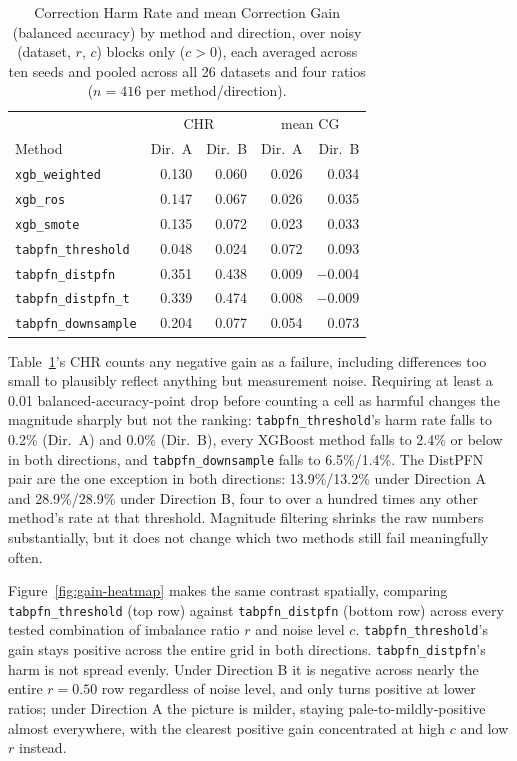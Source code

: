 \begin{table}[t]
\centering
\caption{Correction Harm Rate and mean Correction Gain (balanced accuracy)
by method and direction, over noisy (dataset, $r$, $c$) blocks only
($c>0$), each averaged across ten seeds and pooled across all 26 datasets
and four ratios ($n{=}416$ per method/direction).}
\label{tab:robustness}
\begin{tabular}{@{}lrrrr@{}}
\toprule
& \multicolumn{2}{c}{CHR} & \multicolumn{2}{c}{mean CG} \\
Method & Dir.\ A & Dir.\ B & Dir.\ A & Dir.\ B \\
\midrule
\texttt{xgb\_weighted}      & 0.130 & 0.060 & 0.026 & 0.034 \\
\texttt{xgb\_ros}           & 0.147 & 0.067 & 0.026 & 0.035 \\
\texttt{xgb\_smote}         & 0.135 & 0.072 & 0.023 & 0.033 \\
\texttt{tabpfn\_threshold}  & 0.048 & 0.024 & 0.072 & 0.093 \\
\texttt{tabpfn\_distpfn}    & 0.351 & 0.438 & 0.009 & $-$0.004 \\
\texttt{tabpfn\_distpfn\_t} & 0.339 & 0.474 & 0.008 & $-$0.009 \\
\texttt{tabpfn\_downsample} & 0.204 & 0.077 & 0.054 & 0.073 \\
\bottomrule
\end{tabular}
\end{table}

Table~\ref{tab:robustness}'s CHR counts any negative gain as a failure,
including differences too small to plausibly reflect anything but
measurement noise. Requiring at least a 0.01 balanced-accuracy-point drop
before counting a cell as harmful changes the magnitude sharply but not
the ranking: \texttt{tabpfn\_threshold}'s harm rate falls to 0.2\% (Dir.\
A) and 0.0\% (Dir.\ B), every XGBoost method falls to 2.4\% or below in
both directions, and \texttt{tabpfn\_downsample} falls to 6.5\%/1.4\%.
The DistPFN pair are the one exception in both directions: 13.9\%/13.2\%
under Direction A and 28.9\%/28.9\% under Direction B, four to over a
hundred times any other method's rate at that threshold. Magnitude
filtering shrinks the raw numbers substantially, but it does not change
which two methods still fail meaningfully often.

Figure~\ref{fig:gain-heatmap} makes the same contrast spatially, comparing
\texttt{tabpfn\_threshold} (top row) against \texttt{tabpfn\_distpfn}
(bottom row) across every tested combination of imbalance ratio $r$ and
noise level $c$. \texttt{tabpfn\_threshold}'s gain stays positive across the
entire grid in both directions. \texttt{tabpfn\_distpfn}'s harm is not
spread evenly. Under Direction B it is negative across nearly the entire
$r{=}0.50$ row regardless of noise level, and only turns positive at
lower ratios; under Direction A the picture is milder, staying pale-to-mildly-positive
almost everywhere, with the clearest positive gain concentrated at high
$c$ and low $r$ instead.

